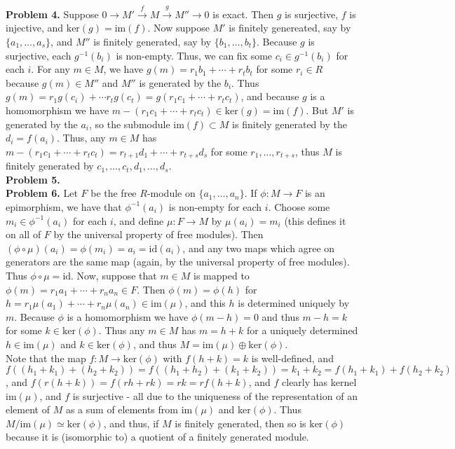 \documentclass[11pt]{article}
\newcommand{\num}[1]{\noindent \textbf{#1}}
\theoremstyle{definition}
\begin{document}
\num{Problem 4.} Suppose $0\rightarrow M'\stackrel{f}{\rightarrow}M\stackrel{g}{\rightarrow}M''\rightarrow0$ is exact. Then $g$ is surjective, $f$ is injective, and $\text{ker}(g)=\text{im}(f)$. Now suppose $M'$ is finitely genereated, say by $\{a_1,\ldots,a_s\}$, and $M''$ is finitely generated, say by $\{b_1,\ldots,b_t\}$. Because $g$ is surjective, each $g^{-1}(b_i)$ is non-empty. Thus, we can fix some $c_i\in g^{-1}(b_i)$ for each $i$. For any $m\in M$, we have $g(m)=r_1b_1+\cdots+r_tb_t$ for some $r_i\in R$ because $g(m)\in M''$ and $M''$ is generated by the $b_i$. Thus $g(m)=r_1g(c_i)+\cdots r_tg(c_t)=g(r_1c_1+\cdots+r_tc_t)$, and because $g$ is a homomorphism we have $m-(r_1c_1+\cdots+r_tc_t)\in\text{ker}(g)=\text{im}(f)$. But $M'$ is generated by the $a_i$, so the submodule $\text{im}(f)\subset M$ is finitely generated by the $d_i=f(a_i)$. Thus, any $m\in M$ has $m-(r_1c_1+\cdots+r_tc_t)=r_{t+1}d_1+\cdots+r_{t+s}d_s$ for some $r_1,\ldots,r_{t+s}$, thus $M$ is finitely generated by $c_1,\ldots,c_t,d_1,\ldots,d_s$.  \\

\num{Problem 5.}\\

\num{Problem 6.} Let $F$ be the free $R$-module on $\{a_1,\ldots,a_n\}$. If $\phi:M\rightarrow F$ is an epimorphism, we have that $\phi^{-1}(a_i)$ is non-empty for each $i$. Choose some $m_i\in\phi^{-1}(a_i)$ for each $i$, and define $\mu:F\rightarrow M$ by $\mu(a_i)=m_i$ (this defines it on all of $F$ by the universal property of free modules). Then $(\phi\circ\mu)(a_i)=\phi(m_i)=a_i=\text{id}(a_i)$, and any two maps which agree on generators are the same map (again, by the universal property of free modules). Thus $\phi\circ\mu=\text{id}$. Now, suppose that $m\in M$ is mapped to $\phi(m)=r_1a_1+\cdots+r_na_n\in F$. Then $\phi(m)=\phi(h)$ for $h=r_1\mu(a_1)+\cdots+r_n\mu(a_n)\in \text{im}(\mu)$, and this $h$ is determined uniquely by $m$. Because $\phi$ is a homomorphism we have $\phi(m-h)=0$ and thus $m-h=k$ for some $k\in \text{ker}(\phi)$. Thus any $m\in M$ has $m=h+k$ for a uniquely determined $h\in\text{im}(\mu)$ and  $k\in\text{ker}(\phi)$, and thus $M=\text{im}(\mu)\oplus\text{ker}(\phi)$.\\

\noindent Note that the map $f:M\rightarrow\text{ker}(\phi)$ with $f(h+k)=k$ is well-defined, and $f((h_1+k_1)+(h_2+k_2))=f((h_1+h_2)+(k_1+k_2))=k_1+k_2=f(h_1+k_1)+f(h_2+k_2)$, and  $f(r(h+k))=f(rh+rk)=rk=rf(h+k)$, and $f$ clearly has kernel $\text{im}(\mu)$, and $f$ is surjective - all due to the uniqueness of the representation of an element of $M$ as a sum of elements from im$(\mu)$ and ker$(\phi)$. Thus $M/\text{im}(\mu)\simeq \text{ker}(\phi)$, and thus, if $M$ is finitely generated, then so is $\text{ker}(\phi)$ because it is (isomorphic to) a quotient of a finitely generated module.\\
\end{document}
